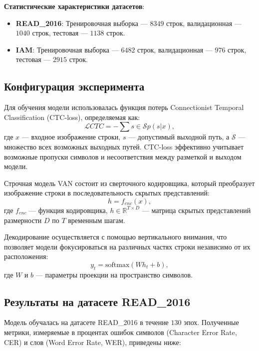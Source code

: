 \documentclass{article}
\begin{document}
\textbf{Статистические характеристики датасетов}:
\begin{itemize}
\item \textbf{READ\_2016}: Тренировочная выборка — $8349$ строк, валидационная — $1040$ строк, тестовая — $1138$ строк.
\item \textbf{IAM}: Тренировочная выборка — $6482$ строк, валидационная — $976$ строк, тестовая — $2915$ строк.
\end{itemize}

\subsection{Конфигурация эксперимента}

Для обучения модели использовалась функция потерь Connectionist Temporal Classification (CTC-loss), определяемая как:
\begin{equation}
\mathcal{L}{CTC} = - \sum{s \in \mathcal{S}} p(s | x),
\end{equation}
где $x$ — входное изображение строки, $s$ — допустимый выходной путь, а $\mathcal{S}$ — множество всех возможных выходных путей. CTC-loss эффективно учитывает возможные пропуски символов и несоответствия между разметкой и выходом модели.

Строчная модель VAN состоит из сверточного кодировщика, который преобразует изображение строки в последовательность скрытых представлений:
\begin{equation}
h = f_{enc}(x),
\end{equation}
где $f_{enc}$ — функция кодировщика, $h \in \mathbb{R}^{T \times D}$ — матрица скрытых представлений размерности $D$ по $T$ временным шагам.

Декодирование осуществляется с помощью вертикального внимания, что позволяет модели фокусироваться на различных частях строки независимо от их расположения:
\begin{equation}
y_t = \text{softmax}(W h_t + b),
\end{equation}
где $W$ и $b$ — параметры проекции на пространство символов.

\subsection{Результаты на датасете READ\_2016}

Модель обучалась на датасете READ\_2016 в течение $130$ эпох. Полученные метрики, измеряемые в процентах ошибок символов (Character Error Rate, CER) и слов (Word Error Rate, WER), приведены ниже:
\end{document}
